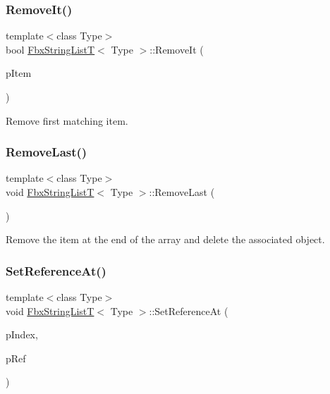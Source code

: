 \subsubsection{\texorpdfstring{Remove\+It()}{RemoveIt()}}
{\footnotesize\ttfamily template$<$class Type$>$ \\
bool \hyperlink{class_fbx_string_list_t}{Fbx\+String\+ListT}$<$ Type $>$\+::Remove\+It (\begin{DoxyParamCaption}\item[{Type \&}]{p\+Item }\end{DoxyParamCaption})}



Remove first matching item. 

\mbox{\label{class_fbx_string_list_t_aa4a95c08fe634e37cf9ccc41b28a9d11}} 
\subsubsection{\texorpdfstring{Remove\+Last()}{RemoveLast()}}
{\footnotesize\ttfamily template$<$class Type$>$ \\
void \hyperlink{class_fbx_string_list_t}{Fbx\+String\+ListT}$<$ Type $>$\+::Remove\+Last (\begin{DoxyParamCaption}{ }\end{DoxyParamCaption})}



Remove the item at the end of the array and delete the associated object. 

\mbox{\label{class_fbx_string_list_t_a8ad989bfb74117a2bd948538ae1437ba}} 
\subsubsection{\texorpdfstring{Set\+Reference\+At()}{SetReferenceAt()}}
{\footnotesize\ttfamily template$<$class Type$>$ \\
void \hyperlink{class_fbx_string_list_t}{Fbx\+String\+ListT}$<$ Type $>$\+::Set\+Reference\+At (\begin{DoxyParamCaption}\item[{int}]{p\+Index,  }\item[{Fbx\+Handle}]{p\+Ref }\end{DoxyParamCaption})}



